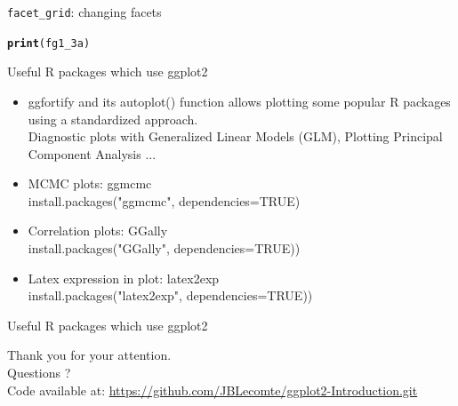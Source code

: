 \documentclass{beamer}\usepackage[]{graphicx}\usepackage[]{color}
\makeatletter
\newcommand{\hlstd}[1]{\textcolor[rgb]{0.345,0.345,0.345}{#1}}%
\newcommand{\hlkwd}[1]{\textcolor[rgb]{0.737,0.353,0.396}{\textbf{#1}}}%
\newenvironment{kframe}{%
 \def\at@end@of@kframe{}%
 \ifinner\ifhmode%
  \def\at@end@of@kframe{\end{minipage}}%
  \begin{minipage}{\columnwidth}%
 \fi\fi%
 \def\FrameCommand##1{\hskip\@totalleftmargin \hskip-\fboxsep
 \colorbox{shadecolor}{##1}\hskip-\fboxsep
     \hskip-\linewidth \hskip-\@totalleftmargin \hskip\columnwidth}%
 \MakeFramed {\advance\hsize-\width
   \@totalleftmargin\z@ \linewidth\hsize
   \@setminipage}}%
 {\par\unskip\endMakeFramed%
 \at@end@of@kframe}
\newenvironment{knitrout}{}{} %
\makeatother
\begin{document}
\begin{frame}[fragile]{\lstinline{facet_grid}: changing facets}
\begin{knitrout}\footnotesize
{}\color{fgcolor}\begin{kframe}
\begin{alltt}
\hlkwd{print}\hlstd{(fg1_3a)}
\end{alltt}


{\ttfamily\noindent\bfseries\color{errorcolor}{\#\# Error in print(fg1\_3a): object 'fg1\_3a' not found}}\end{kframe}
\end{knitrout}
\end{frame}

\begin{frame}{Useful R packages which use ggplot2}
\begin{itemize}
\item	ggfortify and its autoplot() function allows plotting some popular R packages using a standardized approach. \\
Diagnostic plots with Generalized Linear Models (GLM), Plotting Principal Component Analysis ...
\item MCMC plots: ggmcmc \\ install.packages("ggmcmc", dependencies=TRUE)
\item Correlation plots: GGally \\ install.packages("GGally", dependencies=TRUE))
\item Latex expression in plot: latex2exp \\ install.packages("latex2exp", dependencies=TRUE))
\end{itemize}
\end{frame}

\begin{frame}{Useful R packages which use ggplot2}
\begin{center}
Thank you for your attention.\\
\vspace{0.5cm}
Questions ?\\
\vspace{0.5cm}
Code available at: \url{https://github.com/JBLecomte/ggplot2-Introduction.git}

\end{center}
\end{frame}
\end{document}
